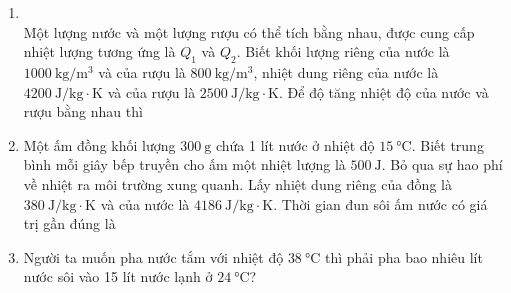 \begin{enumerate}[label=\bfseries Câu \arabic*:, leftmargin=1.7cm]
\item {}\\
Một lượng nước và một lượng rượu có thể tích bằng nhau, được cung cấp nhiệt lượng tương ứng là $Q_1$ và $Q_2$. Biết khối lượng riêng của nước là $\SI{1000}{\kilogram/\meter^3}$ và của rượu là $\SI{800}{\kilogram/\meter^3}$, nhiệt dung riêng của nước là $\SI{4200}{\joule/\kilogram\cdot\kelvin}$ và của rượu là $\SI{2500}{\joule/\kilogram\cdot\kelvin}$. Để độ tăng nhiệt độ của nước và rượu bằng nhau thì

\item Một ấm đồng khối lượng $\SI{300}{\gram}$ chứa 1 lít nước ở nhiệt độ $\SI{15}{\celsius}$. Biết trung bình mỗi giây bếp truyền cho ấm một nhiệt lượng là $\SI{500}{\joule}$. Bỏ qua sự hao phí về nhiệt ra môi trường xung quanh. Lấy nhiệt dung riêng của đồng là $\SI{380}{\joule/\kilogram\cdot\kelvin}$ và của nước là $\SI{4186}{\joule/\kilogram\cdot\kelvin}$. Thời gian đun sôi ấm nước có giá trị gần đúng là

\item Người ta muốn pha nước tắm với nhiệt độ $\SI{38}{\celsius}$ thì phải pha bao nhiêu lít nước sôi vào 15 lít nước lạnh ở $\SI{24}{\celsius}$?


\end{enumerate}
